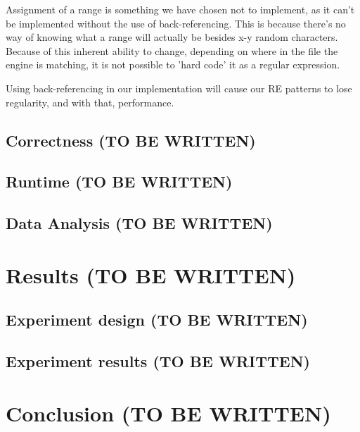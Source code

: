 \documentclass[12pt]{article}
\theoremstyle{definition}
\begin{document}
Assignment of a range is something we have chosen not to implement, as it can't be implemented without the use of back-referencing. This is because there's no way of knowing what a range will actually be besides x-y random characters. Because of this inherent ability to change, depending on where in the file the engine is matching, it is not possible to 'hard code' it as a regular expression.

Using back-referencing in our implementation will cause our RE patterns to lose regularity, and with that, performance.

\subsection{Correctness (TO BE WRITTEN)}

\subsection{Runtime (TO BE WRITTEN)}

\subsection{Data Analysis (TO BE WRITTEN)}

\section{Results (TO BE WRITTEN)}

\subsection{Experiment design (TO BE WRITTEN)}

\subsection{Experiment results (TO BE WRITTEN)}

\section{Conclusion (TO BE WRITTEN)}

\newpage


\nocite{*}

\end{document}
